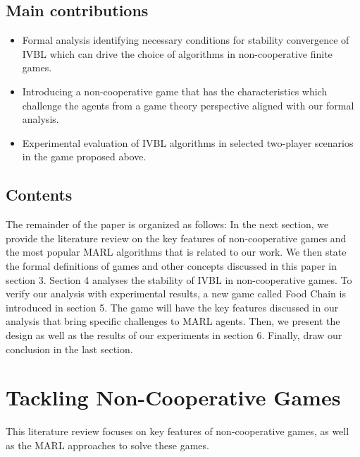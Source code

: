 \documentclass[]{interact}
\theoremstyle{plain}%
\theoremstyle{definition}
\theoremstyle{remark}
\begin{document}
\subsection{Main contributions}
\begin{itemize}
    \item Formal analysis identifying necessary conditions for stability convergence of IVBL which can drive the choice of algorithms in non-cooperative finite games.
    \item Introducing a non-cooperative game that has the characteristics which challenge the agents from a game theory perspective aligned with our formal analysis.
    \item Experimental evaluation of IVBL algorithms in selected two-player scenarios in the game proposed above.
\end{itemize}

\subsection{Contents}
The remainder of the paper is organized as follows:
In the next section, we provide the literature review on the key features of non-cooperative games and the most popular MARL algorithms that is related to our work. We then state the formal definitions of games and other concepts discussed in this paper in section 3. Section 4 analyses the stability of IVBL in non-cooperative games. To verify our analysis with experimental results, a new game called Food Chain is introduced in section 5. The game will have the key features discussed in our analysis that bring specific challenges to MARL agents. Then, we present the design as well as the results of our experiments in section 6. Finally, draw our conclusion in the last section.

\section{Tackling Non-Cooperative Games}
This literature review focuses on key features of non-cooperative games, as well as the MARL approaches to solve these games.
\end{document}
